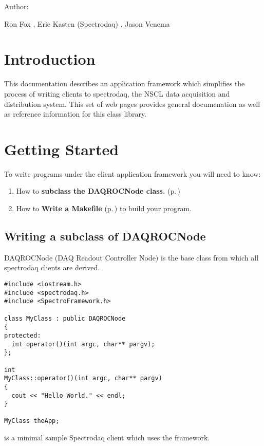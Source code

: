 

\begin{Desc}
\item[Author: ]\par
Ron Fox , Eric Kasten (Spectrodaq) , Jason Venema\end{Desc}
\section{Introduction}\label{Intro}


This documentation describes an application framework which simplifies the process of writing clients to spectrodaq, the NSCL data acquisition and distribution system. This set of web pages provides general documenation as well as reference information for this class library.

\section{Getting Started}\label{Starting}


To write programs under the client application framework you will need to know:\begin{enumerate}
\item 
How to {\bf subclass the DAQROCNode class.} {\rm (p.\,\pageref{Writing})}\item 
How to  {\bf Write a Makefile} {\rm (p.\,\pageref{Makefile})}  to build your program.\end{enumerate}
\subsection{Writing a subclass of DAQROCNode}\label{Writing}


DAQROCNode (DAQ Readout Controller Node) is the base class from which all spectrodaq clients are derived.  

\footnotesize\begin{verbatim}#include <iostream.h>
#include <spectrodaq.h>
#include <SpectroFramework.h>

class MyClass : public DAQROCNode
{
protected:
  int operator()(int argc, char** pargv);
};

int
MyClass::operator()(int argc, char** pargv)
{
  cout << "Hello World." << endl;
}

MyClass theApp;
\end{verbatim}\normalsize 
 is a minimal sample Spectrodaq client which uses the framework.


